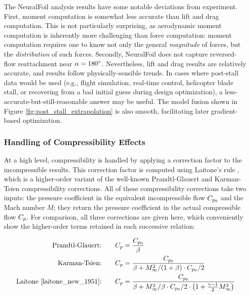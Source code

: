 The NeuralFoil analysis results have some notable deviations from experiment. First, moment computation is somewhat less accurate than lift and drag computation. This is not particularly surprising, as aerodynamic moment computation is inherently more challenging than force computation: moment computation requires one to know not only the general \emph{magnitude} of forces, but the \emph{distribution} of such forces. Secondly, NeuralFoil does not capture reversed-flow reattachment near $\alpha=180\degree$. Nevertheless, lift and drag results are relatively accurate, and results follow physically-sensible trends. In cases where post-stall data would be used (e.g., flight simulation, real-time control, helicopter blade stall, or recovering from a bad initial guess during design optimization), a less-accurate-but-still-reasonable answer may be useful. The model fusion shown in Figure \ref{fig:post_stall_extrapolation} is also smooth, facilitating later gradient-based optimization.

\subsubsection{Handling of Compressibility Effects}
\label{sec:nf-compressibility}

At a high level, compressibility is handled by applying a correction factor to the incompressible results. This correction factor is computed using Laitone's rule \cite{laitone_new_1951}, which is a higher-order variant of the well-known Prandtl-Glauert and Karman-Tsien compressibility corrections. All of these compressibility corrections take two inputs: the pressure coefficient in the equivalent incompressible flow $C_{p_0}$ and the Mach number $M$; they return the pressure coefficient in the actual compressible flow $C_p$. For comparison, all three corrections are given here, which conveniently show the higher-order terms retained in each successive relation:

\begin{align}
    \label{eq:prandtl-glauert} \text{Prandtl-Glauert:} \qquad & C_p = \frac{C_{p_0}}{\beta} \\
    \label{eq:karman-tsien} \text{Karman-Tsien:}\qquad    & C_p = \frac{C_{p_0}}{\beta + M_\infty^2 / (1 + \beta) \cdot C_{p_0} / 2} \\
    \label{eq:laitone} \text{Laitone \cite{laitone_new_1951}:}\qquad & C_p = \frac{C_{p_0}}{\beta + M_\infty^2 / \beta \cdot C_{p_0} / 2 \cdot \left( 1 + \frac{\gamma - 1}{2} M_\infty^2 \right)}
\end{align}

